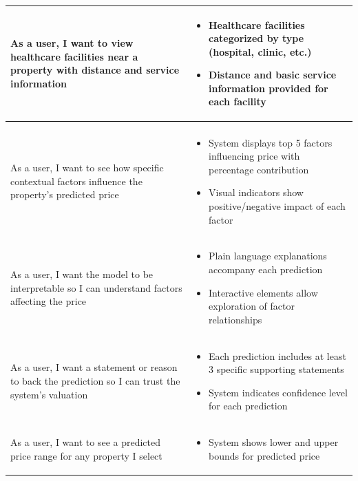 \begin{longtable}{>{\raggedright\arraybackslash}p{}>{\raggedright\arraybackslash}p{}}
	As a user, I want to view healthcare facilities near a property with distance and service information &
	\begin{itemize}
	\item Healthcare facilities categorized by type (hospital, clinic, etc.)
	\item Distance and basic service information provided for each facility
	\end{itemize} \\
	
	\midrule
	\multicolumn{2}{l}{\textbf{Explainable Price Prediction Model}} \\
	\midrule
	As a user, I want to see how specific contextual factors influence the property's predicted price &
	\begin{itemize}
	\item System displays top 5 factors influencing price with percentage contribution
	\item Visual indicators show positive/negative impact of each factor
	\end{itemize} \\
	  
	\rowcolor[gray]{0.95}
	As a user, I want the model to be interpretable so I can understand factors affecting the price &
	\begin{itemize}
	\item Plain language explanations accompany each prediction
	\item Interactive elements allow exploration of factor relationships
	\end{itemize} \\
	  
	As a user, I want a statement or reason to back the prediction so I can trust the system's valuation &
	\begin{itemize}
	\item Each prediction includes at least 3 specific supporting statements
	\item System indicates confidence level for each prediction
	\end{itemize} \\
	  
	\rowcolor[gray]{0.95}
	As a user, I want to see a predicted price range for any property I select &
	\begin{itemize}
	\item System shows lower and upper bounds for predicted price
	\end{itemize} \\
	  

\end{longtable}
